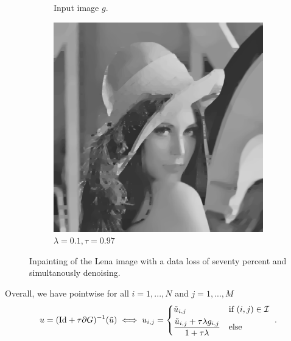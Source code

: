 \documentclass[abstracton]{scrreprt}
\begin{document}
\begin{figure}[!ht]
\begin{subfigure}[b]{0.30\textwidth}
                \caption{Input image $g$.}
            \end{subfigure}
            \begin{subfigure}[b]{0.30\textwidth}
                \includegraphics[width=\textwidth]{img/inpainting/01lena.png}
                \caption{$\lambda = 0.1, \tau = 0.97$}
            \end{subfigure}
            \caption[Inpainting with seventy percent data loss with denoising.]{Inpainting of the Lena image with a data loss of seventy percent and simultanously denoising.}
        \label{fig:inpainting_lena_rof}
        \end{figure}
        Overall, we have pointwise for all $i = 1, ..., N$ and $j = 1, ..., M$
            \begin{equation}
                u = (\textnormal{Id} + \tau \partial G)^{-1}(\tilde{u}) \iff u_{i,j} =
                \begin{dcases*}
                    \tilde{u}_{i,j} & \textnormal{if $(i,j) \in \mathcal{I}$} \\
                    \frac{\tilde{u}_{i,j} + \tau \lambda g_{i,j}}{1 + \tau\lambda} & \textnormal{else}
                \end{dcases*}.
            \end{equation}
\end{document}

